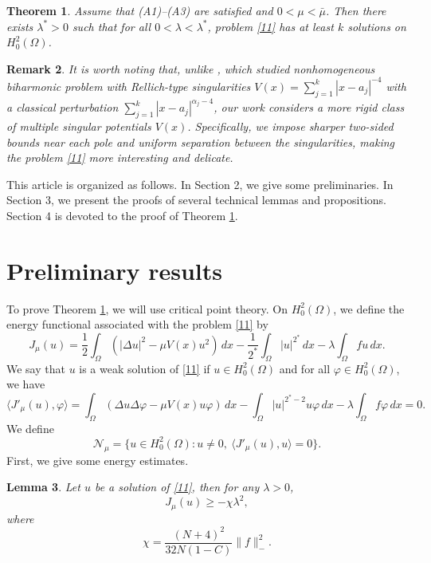 \documentclass[10pt,a4paper]{amsart}
\numberwithin{equation}{section}
\newtheorem{theorem}{Theorem}[section]
\newtheorem{lemma}[theorem]{Lemma}
\newtheorem{remark}[theorem]{Remark}
\begin{document}
 \begin{theorem}\label{tm}
Assume that {\rm (A1)--(A3)} are satisfied and \(0<\mu<\bar{\mu}\).
Then there exists \(\lambda ^*> 0\) such that for all \(0<\lambda <\lambda^*\),
problem \eqref{11} has at least \(k\) solutions on \(H^2_0(\Omega)\).
\end{theorem}

\begin{remark} \rm
It is worth noting that, unlike \cite{ms}, which studied nonhomogeneous biharmonic
problem with Rellich-type singularities \(V(x)= \sum_{j=1}^{k} |x-a_j|^{-4}\) with
a classical perturbation \(\sum_{j=1}^{k} |x-a_j|^{\alpha_j-4}\), our work considers
a more rigid class of multiple singular potentials \(V(x)\).
Specifically, we impose sharper two-sided bounds near each pole and uniform separation
between the singularities, making the problem \eqref{11} more interesting and delicate.
\end{remark}

This article is organized as follows. In Section 2, we give some preliminaries.
In Section 3, we present the proofs of several technical lemmas and propositions.
Section 4 is devoted to the proof of Theorem \ref{tm}.

\section{Preliminary results}

To prove Theorem \ref{tm}, we will use critical point theory.
On \(H^2_0(\Omega)\), we define the energy functional associated with the problem
\eqref{11} by
\[
 J_\mu (u)=\frac{1}{2}\int_{\Omega}(|\Delta u|^2-\mu V(x)u^2)\,dx
 -\frac{1}{2^*} \int_{\Omega} |u|^{2^*}\,dx-\lambda \int_{\Omega} fu\,dx.
\]
We say that \(u\) is a weak solution of \eqref{11} if \(u\in H^2_0(\Omega)\) and for
all \( \varphi \in H^2_0(\Omega)\), we have
\[
\langle J'_\mu (u), \varphi\rangle=\int_{\Omega}
 (\Delta u\Delta \varphi-\mu V(x)u\varphi)\,dx- \int_{\Omega} |u|^{2^*-2}u\varphi\,dx
-\lambda \int_{\Omega} f \varphi\,dx=0.
\]
We define
\[
 \mathcal{N}_\mu=\{ u \in H^2_0(\Omega): u\neq 0, \ \langle J'_\mu (u),
 u\rangle=0 \}.
\]
First, we give some energy estimates.

\begin{lemma}\label{lm}
 Let $u$ be a solution of \eqref{11}, then for any $\lambda>0$,
$$
 J_{\mu}(u)\geq -\chi \lambda^2,
$$
where
$$
\chi =\frac{(N+4)^2}{32N(1-C)}\|f\|_-^2.
$$
 \end{lemma}
\end{document}
